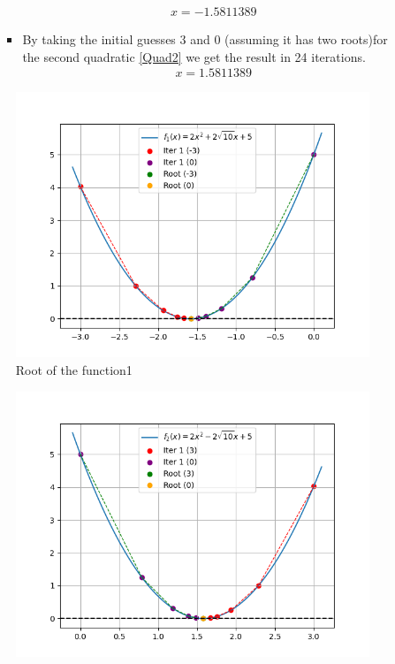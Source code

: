 \documentclass[journal]{IEEEtran}
\numberwithin{equation}{enumi}
\numberwithin{figure}{enumi}
\begin{document}
\begin{enumerate}
\begin{itemize}
\begin{itemize}
        \begin{align}
            x = -1.5811389
        \end{align}
        \item By taking the initial guesses 3 and 0 (assuming it has two roots)for the second quadratic \eqref{Quad2} we get the result in 24 iterations. 
        \begin{align}
            x = 1.5811389
        \end{align}
    \end{itemize}
    \end{itemize}
    \begin{multicols}{2}	
	\begin{figure}[H]
   \centering
   \includegraphics[width=1\columnwidth]{figs/fig1.png}
   \caption{Root of the function1}
\end{figure}
\begin{figure}[H]
   \centering
   \includegraphics[width=1\columnwidth]{figs/fig2.png}

\end{figure}
\end{multicols}
\end{enumerate}
\end{document}
